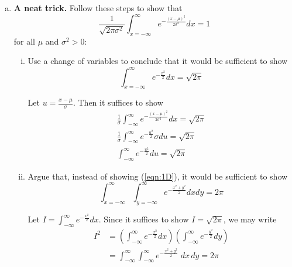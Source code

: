 \documentclass[12pt]{article}
\begin{document}
\begin{enumerate}[1.]
\begin{enumerate}[(a)]
		      \item {\bf A neat trick.} Follow these steps to show that
		            \[
			            \frac{1}{\sqrt{2\pi \sigma^2}} \int_{x=-\infty}^\infty e^{-\frac{(x-\mu)^2}{2\sigma^2}} dx = 1
		            \]
		            for all $\mu$ and $\sigma^2>0$:
		            \begin{enumerate}[i.]
			            \item Use a change of variables to conclude that it would be sufficient to show
			                  \begin{equation}
				                  \label{eqn:1D}
				                  \int_{x=-\infty}^\infty e^{-\frac{x^2}{2}} dx =\sqrt{2\pi}
			                  \end{equation}

			                  \color{blue}
			                  Let $u = \frac{x - \mu}{\sigma}$. Then it suffices to show
			                  \begin{gather*}
				                  \frac{1}{\sigma} \int_{-\infty}^\infty e^{-\frac{(x-\mu)^2}{2\sigma^2}} dx  = \sqrt{2\pi} \\
				                  \frac{1}{\sigma}\int_{-\infty}^\infty e^{-\frac{u^2}{2}} \sigma du = \sqrt{2\pi} \\
				                  \int_{-\infty}^\infty e^{-\frac{u^2}{2}} du = \sqrt{2\pi}
			                  \end{gather*}
			                  \color{black}

			            \item Argue that, instead of showing (\ref{eqn:1D}), it would be sufficient to show
			                  \begin{equation}
				                  \label{eqn:2D}
				                  \int_{x=-\infty}^\infty  \int_{y=-\infty}^\infty e^{-\frac{x^2+y^2}{2}} dxdy =2\pi
			                  \end{equation}

			                  \color{blue}
			                  Let $I = \int_{-\infty}^\infty e^{-\frac{x^2}{2}} dx$. Since it suffices to show $I = \sqrt{2\pi}$, we may write
			                  \begin{align*}
				                  I^2 & = \left(\int_{-\infty}^\infty e^{-\frac{x^2}{2}} dx\right)\left(\int_{-\infty}^\infty e^{-\frac{y^2}{2}} dy\right) \\
				                      & = \int_{-\infty}^\infty  \int_{-\infty}^\infty e^{-\frac{x^2+y^2}{2}} \;dx\,dy = 2\pi
			                  \end{align*}
			                  \color{black}


\end{enumerate}
\end{enumerate}
\end{enumerate}
\end{document}
